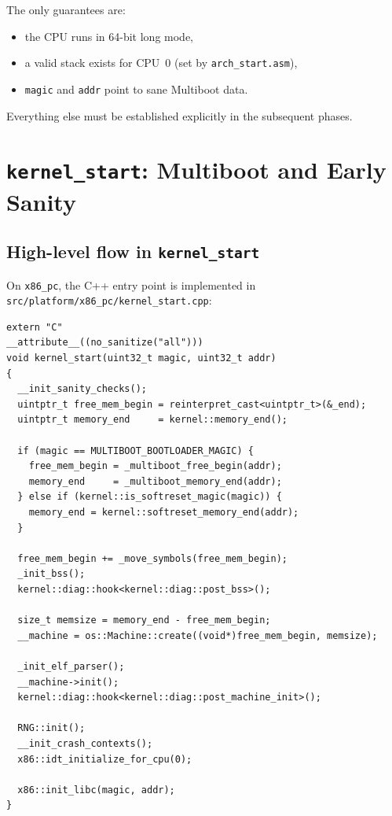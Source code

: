 \documentclass[a4paper,11pt]{article}
\begin{document}
The only guarantees are:

\begin{itemize}
  \item the CPU runs in 64-bit long mode,
  \item a valid stack exists for CPU~0 (set by \texttt{arch\_start.asm}),
  \item \texttt{magic} and \texttt{addr} point to sane Multiboot data.
\end{itemize}

Everything else must be established explicitly in the subsequent phases.

\section{\texorpdfstring{\texttt{kernel\_start}}{kernel\_start}: Multiboot and Early Sanity}

\subsection{High-level flow in \texttt{kernel\_start}}

On \texttt{x86\_pc}, the C++ entry point is implemented in
\texttt{src/platform/x86\_pc/kernel\_start.cpp}:

\begin{verbatim}
extern "C"
__attribute__((no_sanitize("all")))
void kernel_start(uint32_t magic, uint32_t addr)
{
  __init_sanity_checks();
  uintptr_t free_mem_begin = reinterpret_cast<uintptr_t>(&_end);
  uintptr_t memory_end     = kernel::memory_end();

  if (magic == MULTIBOOT_BOOTLOADER_MAGIC) {
    free_mem_begin = _multiboot_free_begin(addr);
    memory_end     = _multiboot_memory_end(addr);
  } else if (kernel::is_softreset_magic(magic)) {
    memory_end = kernel::softreset_memory_end(addr);
  }

  free_mem_begin += _move_symbols(free_mem_begin);
  _init_bss();
  kernel::diag::hook<kernel::diag::post_bss>();

  size_t memsize = memory_end - free_mem_begin;
  __machine = os::Machine::create((void*)free_mem_begin, memsize);

  _init_elf_parser();
  __machine->init();
  kernel::diag::hook<kernel::diag::post_machine_init>();

  RNG::init();
  __init_crash_contexts();
  x86::idt_initialize_for_cpu(0);

  x86::init_libc(magic, addr);
}
\end{verbatim}
\end{document}
